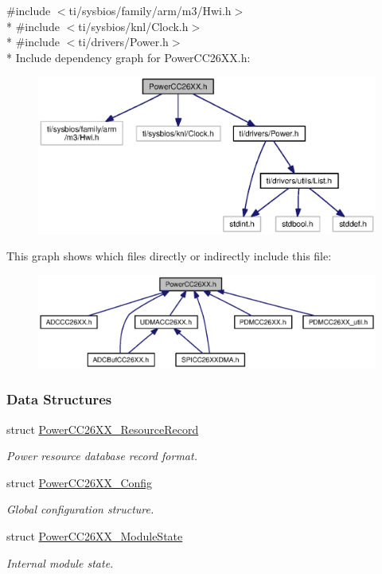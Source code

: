 {\ttfamily \#include $<$ti/sysbios/family/arm/m3/\+Hwi.\+h$>$}\\*
{\ttfamily \#include $<$ti/sysbios/knl/\+Clock.\+h$>$}\\*
{\ttfamily \#include $<$ti/drivers/\+Power.\+h$>$}\\*
Include dependency graph for Power\+C\+C26\+X\+X.\+h\+:
\nopagebreak
\begin{figure}[H]
\begin{center}
\leavevmode
\includegraphics[width=350pt]{_power_c_c26_x_x_8h__incl}
\end{center}
\end{figure}
This graph shows which files directly or indirectly include this file\+:
\nopagebreak
\begin{figure}[H]
\begin{center}
\leavevmode
\includegraphics[width=350pt]{_power_c_c26_x_x_8h__dep__incl}
\end{center}
\end{figure}
\subsubsection*{Data Structures}
\begin{DoxyCompactItemize}
\item 
struct \hyperlink{struct_power_c_c26_x_x___resource_record}{Power\+C\+C26\+X\+X\+\_\+\+Resource\+Record}
\begin{DoxyCompactList}\small\item\em Power resource database record format. \end{DoxyCompactList}\item 
struct \hyperlink{struct_power_c_c26_x_x___config}{Power\+C\+C26\+X\+X\+\_\+\+Config}
\begin{DoxyCompactList}\small\item\em Global configuration structure. \end{DoxyCompactList}\item 
struct \hyperlink{struct_power_c_c26_x_x___module_state}{Power\+C\+C26\+X\+X\+\_\+\+Module\+State}
\begin{DoxyCompactList}\small\item\em Internal module state. \end{DoxyCompactList}\end{DoxyCompactItemize}
